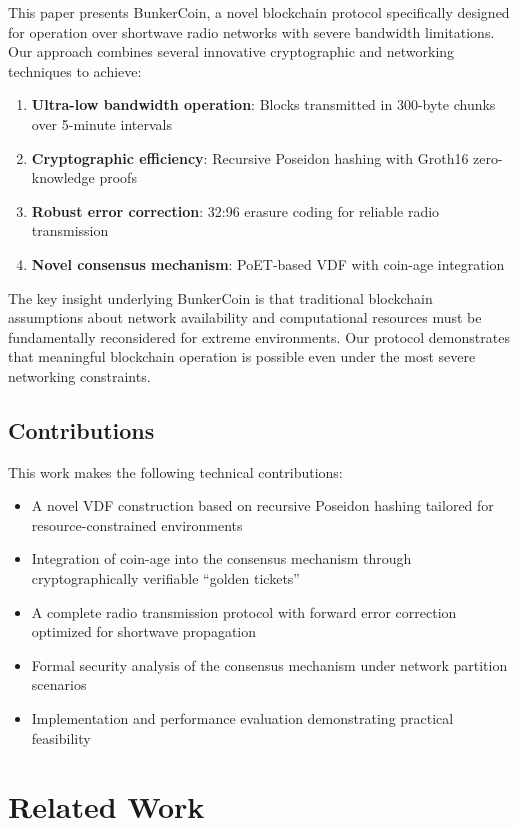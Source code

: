 \documentclass[11pt,a4paper]{article}
\begin{document}
This paper presents BunkerCoin, a novel blockchain protocol specifically designed for operation over shortwave radio networks with severe bandwidth limitations. Our approach combines several innovative cryptographic and networking techniques to achieve:

\begin{enumerate}
\item \textbf{Ultra-low bandwidth operation}: Blocks transmitted in 300-byte chunks over 5-minute intervals
\item \textbf{Cryptographic efficiency}: Recursive Poseidon hashing with Groth16 zero-knowledge proofs
\item \textbf{Robust error correction}: 32:96 erasure coding for reliable radio transmission
\item \textbf{Novel consensus mechanism}: PoET-based VDF with coin-age integration
\end{enumerate}

The key insight underlying BunkerCoin is that traditional blockchain assumptions about network availability and computational resources must be fundamentally reconsidered for extreme environments. Our protocol demonstrates that meaningful blockchain operation is possible even under the most severe networking constraints.

\subsection{Contributions}

This work makes the following technical contributions:

\begin{itemize}
\item A novel VDF construction based on recursive Poseidon hashing tailored for resource-constrained environments
\item Integration of coin-age into the consensus mechanism through cryptographically verifiable ``golden tickets''
\item A complete radio transmission protocol with forward error correction optimized for shortwave propagation
\item Formal security analysis of the consensus mechanism under network partition scenarios
\item Implementation and performance evaluation demonstrating practical feasibility
\end{itemize}

\section{Related Work}
\end{document}
